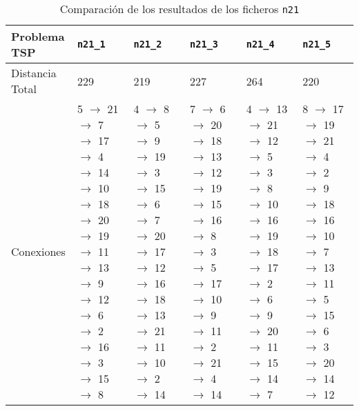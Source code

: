 \documentclass[a4paper,11pt]{article}
\begin{document}
\begin{table}[!htbp]
\label{results_100}
\centering
\begin{tabularx}{\textwidth}{|p{2cm}|X|X|X|X|X|}
\hline
Problema TSP	& \texttt{n21\_1}	& \texttt{n21\_2}	& \texttt{n21\_3}	& \texttt{n21\_4}	& \texttt{n21\_5} \\ \hline
Distancia Total    & 229    & 219   & 227   & 264   & 220	\\ \hline
Conexiones	& 5 $\to$ 21 $\to$ 7 $\to$ 17 $\to$ 4 $\to$ 14 $\to$ 10 $\to$ 18 $\to$ 20 $\to$ 19 $\to$ 11 $\to$ 13 $\to$ 9 $\to$ 12 $\to$ 6 $\to$ 2 $\to$ 16 $\to$ 3 $\to$ 15 $\to$ 8  & 4 $\to$ 8 $\to$ 5 $\to$ 9 $\to$ 19 $\to$ 3 $\to$ 15 $\to$ 6 $\to$ 7 $\to$ 20 $\to$ 17 $\to$ 12 $\to$ 16 $\to$ 18 $\to$ 13 $\to$ 21 $\to$ 11 $\to$ 10 $\to$ 2 $\to$ 14  & 7 $\to$ 6 $\to$ 20 $\to$ 18 $\to$ 13 $\to$ 12 $\to$ 19 $\to$ 15 $\to$ 16 $\to$ 8 $\to$ 3 $\to$ 5 $\to$ 17 $\to$ 10 $\to$ 9 $\to$ 11 $\to$ 2 $\to$ 21 $\to$ 4 $\to$ 14  & 4 $\to$ 13 $\to$ 21 $\to$ 12 $\to$ 5 $\to$ 3 $\to$ 8 $\to$ 10 $\to$ 16 $\to$ 19 $\to$ 18 $\to$ 17 $\to$ 2 $\to$ 6 $\to$ 9 $\to$ 20 $\to$ 11 $\to$ 15 $\to$ 14 $\to$ 7  & 8 $\to$ 17 $\to$ 19 $\to$ 21 $\to$ 4 $\to$ 2 $\to$ 9 $\to$ 18 $\to$ 16 $\to$ 10 $\to$ 7 $\to$ 13 $\to$ 11 $\to$ 5 $\to$ 15 $\to$ 6 $\to$ 3 $\to$ 20 $\to$ 14 $\to$ 12	\\ \hline
\end{tabularx}
\caption{Comparación de los resultados de los ficheros \texttt{n21}}
\end{table}
\end{document}
